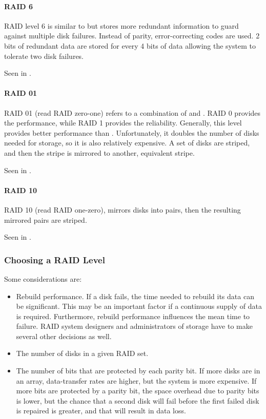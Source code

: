 \paragraph{RAID 6}\label{par:RAID_6}
RAID level 6 is similar to  but stores more redundant information to guard against multiple disk failures.
Instead of parity, error-correcting codes are used.
2 bits of redundant data are stored for every 4 bits of data allowing the system to tolerate two disk failures.

Seen in .

\paragraph{RAID 01}\label{par:RAID_01}
RAID 01 (read RAID zero-one) refers to a combination of  and .
RAID 0 provides the performance, while RAID 1 provides the reliability.
Generally, this level provides better performance than .
Unfortunately, it doubles the number of disks needed for storage, so it is also relatively expensive.
A set of disks are striped, and then the stripe is mirrored to another, equivalent stripe.

Seen in .

\paragraph{RAID 10}\label{par:RAID_10}
RAID 10 (read RAID one-zero), mirrors disks into pairs, then the resulting mirrored pairs are striped.

Seen in .

\subsubsection{Choosing a RAID Level}\label{subsubsec:Choosing_RAID_Level}
Some considerations are:
\begin{itemize}[noitemsep]
\item Rebuild performance.
  If a disk fails, the time needed to rebuild its data can be significant.
  This may be an important factor if a continuous supply of data is required.
  Furthermore, rebuild performance influences the mean time to failure.
  RAID system designers and administrators of storage have to make several other decisions as well.

\item The number of disks in a given RAID set.

\item The number of bits that are protected by each parity bit.
  If more disks are in an array, data-transfer rates are higher, but the system is more expensive.
  If more bits are protected by a parity bit, the space overhead due to parity bits is lower, but the chance that a second disk will fail before the first failed disk is repaired is greater, and that will result in data loss.
\end{itemize}

